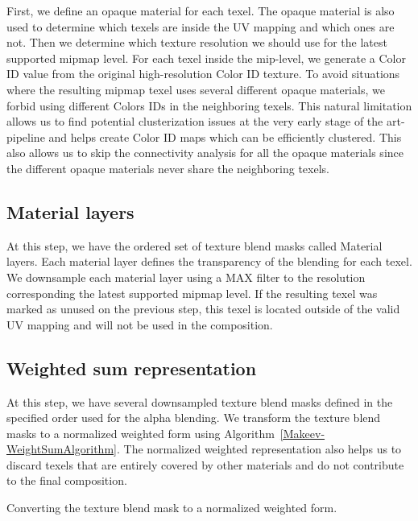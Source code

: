 First, we define an opaque material for each texel.
The opaque material is also used to determine which texels are inside the UV mapping and which ones are not.
Then we determine which texture resolution we should use for the latest supported mipmap level.
For each texel inside the mip-level, we generate a Color ID value from the original high-resolution Color ID texture.
To avoid situations where the resulting mipmap texel uses several different opaque materials, we forbid using different Colors IDs in the neighboring texels.
This natural limitation allows us to find potential clusterization issues at the very early stage of the art-pipeline and helps create Color ID maps which can be efficiently clustered.
This also allows us to skip the connectivity analysis for all the opaque materials since the different opaque materials never share the neighboring texels.

\subsection{Material layers}

At this step, we have the ordered set of texture blend masks called Material layers.
Each material layer defines the transparency of the blending for each texel.
We downsample each material layer using a MAX filter to the resolution corresponding the latest supported mipmap level.
If the resulting texel was marked as unused on the previous step, this texel is located outside of the valid UV mapping and will not be used in the composition. 

\subsection{Weighted sum representation}
\label{Makeev-WeightedSum}

At this step, we have several downsampled texture blend masks defined in the specified order used for the alpha blending.
We transform the texture blend masks to a normalized weighted form using Algorithm~\ref{Makeev-WeightSumAlgorithm}.
The normalized weighted representation also helps us to discard texels that are entirely covered by other materials and do not contribute to the final composition.

\LinesNumbered
\DontPrintSemicolon
\begin{algorithm}\label{Makeev-WeightSumAlgorithm}
\caption{
Converting the texture blend mask to a normalized weighted form.
}
\end{algorithm}


